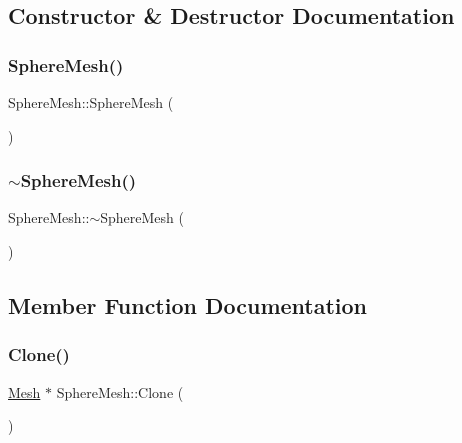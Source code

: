 \subsection{Constructor \& Destructor Documentation}
\mbox{\label{class_sphere_mesh_a96328df52e8e6e34ad043c4131579947}} 
\subsubsection{\texorpdfstring{SphereMesh()}{SphereMesh()}}
{\footnotesize\ttfamily Sphere\+Mesh\+::\+Sphere\+Mesh (\begin{DoxyParamCaption}{ }\end{DoxyParamCaption})}

\mbox{\label{class_sphere_mesh_a7cfb19d071eed16544d3c01c63280399}} 
\subsubsection{\texorpdfstring{$\sim$SphereMesh()}{~SphereMesh()}}
{\footnotesize\ttfamily Sphere\+Mesh\+::$\sim$\+Sphere\+Mesh (\begin{DoxyParamCaption}{ }\end{DoxyParamCaption})}



\subsection{Member Function Documentation}
\mbox{\label{class_sphere_mesh_a5dfa031b4cdd31a81154221c882a5dfa}} 
\subsubsection{\texorpdfstring{Clone()}{Clone()}}
{\footnotesize\ttfamily \mbox{\hyperlink{class_mesh}{Mesh}} $\ast$ Sphere\+Mesh\+::\+Clone (\begin{DoxyParamCaption}{ }\end{DoxyParamCaption})\hspace{0.3cm}{\ttfamily [virtual]}}



